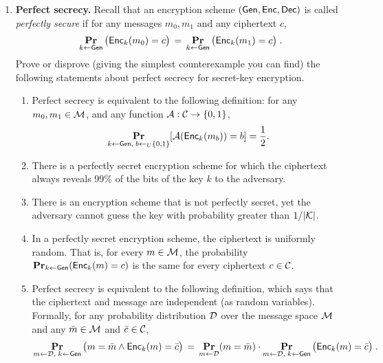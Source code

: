 \documentclass[12pt]{article}
\begin{document}
\begin{enumerate}
		

\item {\bf Perfect secrecy.}
Recall that an encryption scheme $ (\mathsf{Gen}, \mathsf{Enc}, \mathsf{Dec})$ is called \emph{perfectly secure} if for any messages $m_0,m_1$ and any ciphertext $c$, 
\[ \mathop{\bf Pr\/}_{k\gets \mathsf{Gen}}\big( \mathsf{Enc}_k(m_0)=c \big)\,=\, \mathop{\bf Pr\/}_{k\gets \mathsf{Gen}}\big( \mathsf{Enc}_k(m_1)=c \big)\;.\]
  Prove or disprove (giving the
  simplest counterexample you can find) the following statements about
  perfect secrecy for secret-key encryption. 
  \begin{enumerate}
\item Perfect secrecy is equivalent to the following
    definition:
  for any $m_{0}, m_{1} \in \mathcal{M}$, and any function
    $\mathcal{A} : \mathcal{C} \to \{0,1\}$,
    \[ \mathop{\bf Pr\/}_{k \gets \mathsf{Gen},\; b \gets_U \{0,1\}}[\mathcal{A}(\mathsf{Enc}_{k}(m_{b}))
    = b] = \frac{1}{2}. \]
    \item There is a perfectly secret encryption scheme for
    which the ciphertext always reveals 99\% of the bits of the key
    $k$ to the adversary.
\item There is an encryption scheme that is not perfectly secret, yet
    the adversary cannot guess the key with probability greater than $1/|\mathcal{K}|$.
\item In a perfectly secret encryption scheme, the
    ciphertext is uniformly random.  That is, for every $m \in
    \mathcal{M}$, the probability $\mathop{\bf Pr\/}_{k \gets \mathsf{Gen}}(\mathsf{Enc}_{k}(m)
    = {c})$ is the same for every ciphertext ${c} \in
    \mathcal{C}$.
\item Perfect secrecy is equivalent to the following
    definition, which says that the ciphertext and message are
    independent (as random variables).  Formally, for any probability
    distribution $\mathcal{D}$ over the message space $\mathcal{M}$ and any
    $\bar{m} \in \mathcal{M}$ and $\bar{c} \in \mathcal{C}$,
    \[ \mathop{\bf Pr\/}_{m \gets \mathcal{D},\; k \gets \mathsf{Gen}}\big( m = \bar{m} \wedge
    \mathsf{Enc}_{k}(m) = \bar{c}\big) \,=\, \mathop{\bf Pr\/}_{m \gets \mathcal{D}}(m = \bar{m})\cdot
    \mathop{\bf Pr\/}_{m \gets \mathcal{D},\; k \gets \mathsf{Gen}}\big(\mathsf{Enc}_{k}(m) =
    \bar{c}\big)\;. \]
  \end{enumerate}

\end{enumerate}
\end{document}
